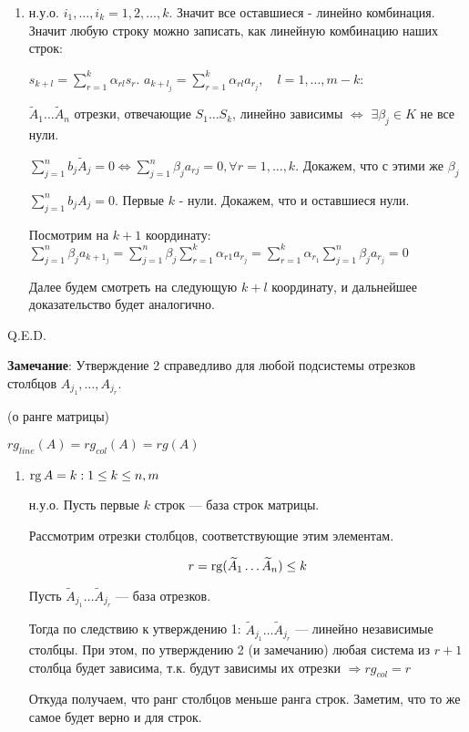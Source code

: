 \begin{enumerate}
    \item[] \prooff{}
          н.у.о. $i_1,\ldots,i_k = 1,2,\ldots, k$. Значит все оставшиеся - линейно комбинация.
          Значит любую строку можно записать, как линейную комбинацию наших строк:

          $s_{k+l}= \sum\limits_{r=1}^k \alpha_{rl}s_r$. $a_{{k+l}_j}=\sum\limits_{r=1}^k \alpha_{rl}a_{r_j}, \quad l= 1, \ldots, m - k$:

          $ \widetilde{A}_1 \ldots \widetilde{A}_n $ отрезки, отвечающие $S_{1} \ldots S_{k} $, линейно зависимы $\Leftrightarrow$ $\exists \beta_j \in K$ не все нули.

          $\sum\limits_{j=1}^n{b_j \widetilde{A}_j}=0 \Leftrightarrow \sum\limits_{j=1}^n \beta_j a_{rj} = 0, \forall r = 1, \ldots, k$. Докажем, что с этими же $\beta_j$

          $\sum\limits_{j=1}^n b_j A_j = 0$. Первые $k$ - нули. Докажем, что и оставшиеся нули.

          Посмотрим на $k+1$ координату: $\sum\limits_{j=1}^n \beta_j a_{k+1_{j}} = \sum\limits_{j=1}^n \beta_j \sum\limits_{r=1}^k \alpha_{r1}a_{r_{j}} = \sum\limits_{r=1}^k \alpha_{r_1}\sum\limits_{j=1}^n \beta_j a_{r_{j}} =0$

          Далее будем смотреть на следующую $k + l$ координату, и дальнейшее доказательство будет аналогично.


\end{enumerate}

\hfill Q.E.D.

\textbf{Замечание}: Утверждение 2 справедливо для любой подсистемы отрезков столбцов $A_{j_1}, \ldots, A_{j_r}$.

 (о ранге матрицы)

\( rg_{line}(A) = rg_{col}(A) = rg(A) \)
\begin{enumerate}
    \item[] \prooff{}
          $\operatorname{rg} A = k: 1 \leq k \leq n,m$

          н.у.о. Пусть первые $k$ строк --- база строк матрицы.

          Рассмотрим отрезки столбцов, соответствующие этим элементам.

          $$r = \operatorname{rg} (\widetilde{A}_1 \ldots \widetilde{A}_n) \leq k$$

          Пусть $\widetilde{A}_{j_1} \ldots \widetilde{A}_{j_r}$ --- база отрезков.

          Тогда по следствию к утверждению 1: $\widetilde{A}_{j_1} \ldots \widetilde{A}_{j_r}$ --- линейно независимые столбцы. При этом, по утверждению 2 (и замечанию) любая система из $r + 1$ столбца будет зависима, т.к. будут зависимы их отрезки $\Rightarrow rg_{col} = r$

          Откуда получаем, что ранг столбцов меньше ранга строк. Заметим, что то же самое будет верно и для строк.
\end{enumerate}

